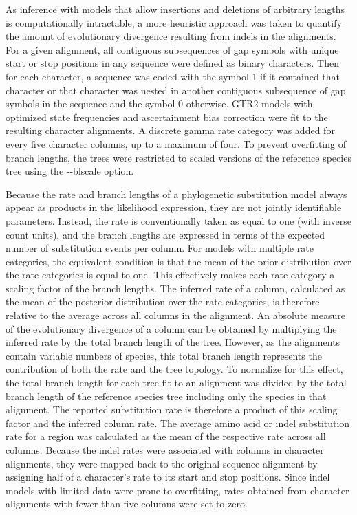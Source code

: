 As inference with models that allow insertions and deletions of arbitrary lengths is computationally intractable, a more heuristic approach was taken to quantify the amount of evolutionary divergence resulting from indels in the alignments. For a given alignment, all contiguous subsequences of gap symbols with unique start or stop positions in any sequence were defined as binary characters. Then for each character, a sequence was coded with the symbol 1 if it contained that character or that character was nested in another contiguous subsequence of gap symbols in the sequence and the symbol 0 otherwise. GTR2 models with optimized state frequencies and ascertainment bias correction were fit to the resulting character alignments. A discrete gamma rate category was added for every five character columns, up to a maximum of four. To prevent overfitting of branch lengths, the trees were restricted to scaled versions of the reference species tree using the -{}-blscale option.

Because the rate and branch lengths of a phylogenetic substitution model always appear as products in the likelihood expression, they are not jointly identifiable parameters. Instead, the rate is conventionally taken as equal to one (with inverse count units), and the branch lengths are expressed in terms of the expected number of substitution events per column. For models with multiple rate categories, the equivalent condition is that the mean of the prior distribution over the rate categories is equal to one. This effectively makes each rate category a scaling factor of the branch lengths. The inferred rate of a column, calculated as the mean of the posterior distribution over the rate categories, is therefore relative to the average across all columns in the alignment. An absolute measure of the evolutionary divergence of a column can be obtained by multiplying the inferred rate by the total branch length of the tree. However, as the alignments contain variable numbers of species, this total branch length represents the contribution of both the rate and the tree topology. To normalize for this effect, the total branch length for each tree fit to an alignment was divided by the total branch length of the reference species tree including only the species in that alignment. The reported substitution rate is therefore a product of this scaling factor and the inferred column rate. The average amino acid or indel substitution rate for a region was calculated as the mean of the respective rate across all columns. Because the indel rates were associated with columns in character alignments, they were mapped back to the original sequence alignment by assigning half of a character's rate to its start and stop positions. Since indel models with limited data were prone to overfitting, rates obtained from character alignments with fewer than five columns were set to zero.

